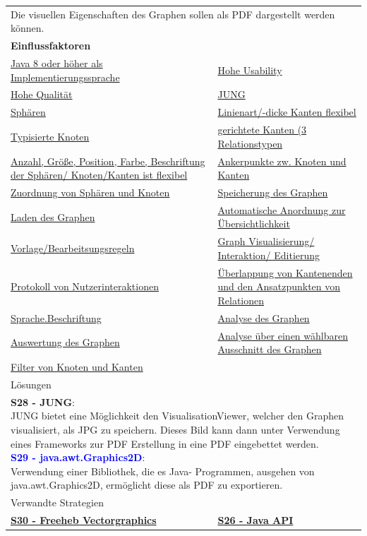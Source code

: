 \documentclass[enabledeprecatedfontcommands,fontsize=11pt,paper=a4,twoside]{scrartcl}
\newcounter{one}
\newcommand{\cb}[1]{{\textcolor{blue}{#1}}}
\begin{document}
\newpage
\begin{tabular} {|p{8cm} p{8cm}|}
	\hline
	\rowcolor{prob}\multicolumn{2}{|l|}{\parbox{16cm}{\textbf{10: PDF Erstellung}}} \\  \hline\hline 
	\multicolumn{2}{|l|}{\parbox{16cm}{Die visuellen Eigenschaften des Graphen sollen als PDF dargestellt werden können.}}\rule{0pt}{1ex}\\ \hline
	\multicolumn{2}{|l|}{\textbf{Einflussfaktoren}}\\
	\hyperlink{b}{Java 8 oder höher als Implementierungssprache} &  
	\hyperlink {g}{Hohe Usability}\\
	\hyperlink {h}{Hohe Qualität} &
	\hyperlink {k}{JUNG} \\
	\hyperlink {n}{Sphären} &
	\hyperlink {o}{Linienart/-dicke Kanten flexibel}\\
	\hyperlink {p}{Typisierte Knoten} &
	\hyperlink {q}{gerichtete Kanten (3 Relationstypen} \\
	\hyperlink {r}{Anzahl, Größe, Position, Farbe, Beschriftung der Sphären/ Knoten/Kanten ist flexibel} &
	\hyperlink {s}{Ankerpunkte zw. Knoten und Kanten} \\
	\hyperlink {t}{Zuordnung von Sphären und Knoten} &
	\hyperlink {v}{Speicherung des Graphen} \\
	\hyperlink {w}{Laden des Graphen} &
	\hyperlink {x}{Automatische Anordnung zur Übersichtlichkeit} \\
	\hyperlink {y}{Vorlage/Bearbeitsungsregeln} &
	\hyperlink {aa}{Graph Visualisierung/ Interaktion/ Editierung}\\
	\hyperlink {bb}{Protokoll von Nutzerinteraktionen} &
	\hyperlink {cc}{Überlappung von Kantenenden und den Ansatzpunkten von Relationen} \\
	\hyperlink {hh}{Sprache.Beschriftung} &
	\hyperlink {oo}{Analyse des Graphen} \\
	\hyperlink {pp}{Auswertung des Graphen} &
	\hyperlink {rr}{Analyse über einen wählbaren Ausschnitt des Graphen} \\ 
	\hyperlink {ss}{Filter von Knoten und Kanten} 
	\\ \hline
	\multicolumn{2}{|l|}{Lösungen} \\
	\multicolumn{2}{|l|}{\parbox{16cm}{
			\textbf{S28 - JUNG}: \\
			JUNG bietet eine Möglichkeit den VisualisationViewer, welcher den Graphen visualisiert, als JPG zu speichern. Dieses Bild kann dann unter Verwendung eines Frameworks zur PDF Erstellung in eine PDF eingebettet werden. \\
			\textbf{\cb{\hypertarget{hhh}{S29 - java.awt.Graphics2D}}}: \\
			Verwendung einer Bibliothek, die es Java- Programmen, ausgehen von java.awt.Graphics2D, ermöglicht diese als PDF zu exportieren. \\
	} }\\ [4ex] \hline
	\multicolumn{2}{|l|}{Verwandte Strategien} \\
	\textbf{\hyperlink{iii}{S30 - Freeheb Vectorgraphics}}&
	\textbf{\hyperlink{ggg}{S26 - Java API}} 
	\\\hline
\end{tabular}\\ \\ \\
\end{document}
